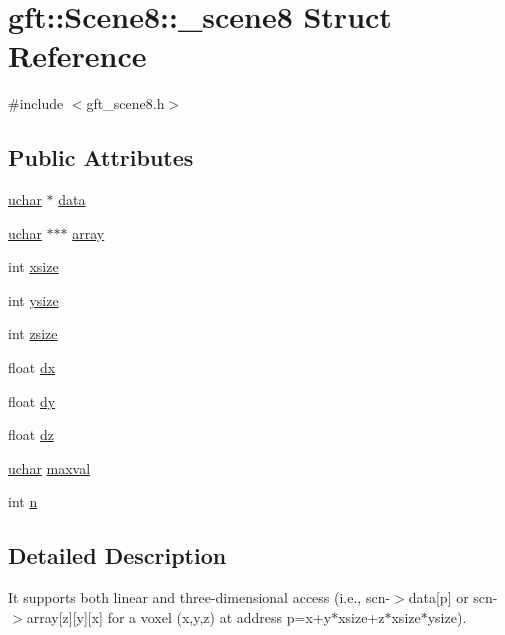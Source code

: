\hypertarget{structgft_1_1Scene8_1_1__scene8}{\section{gft\-:\-:Scene8\-:\-:\-\_\-scene8 Struct Reference}
\label{structgft_1_1Scene8_1_1__scene8}
}


{\ttfamily \#include $<$gft\-\_\-scene8.\-h$>$}

\subsection*{Public Attributes}
\begin{DoxyCompactItemize}
\item 
\hyperlink{namespacegft_a6411e297d5ac5aa9b91a37da00952197}{uchar} $\ast$ \hyperlink{structgft_1_1Scene8_1_1__scene8_aa5d6579e1b372370786e9fcac9aca62c}{data}
\item 
\hyperlink{namespacegft_a6411e297d5ac5aa9b91a37da00952197}{uchar} $\ast$$\ast$$\ast$ \hyperlink{structgft_1_1Scene8_1_1__scene8_abf9e43eda468d5bf3ab460f9d143a7e6}{array}
\item 
int \hyperlink{structgft_1_1Scene8_1_1__scene8_ac686ab156e37bf22332b69cd7cf099c4}{xsize}
\item 
int \hyperlink{structgft_1_1Scene8_1_1__scene8_ae19304fd5aa167a6142b0637312a6da9}{ysize}
\item 
int \hyperlink{structgft_1_1Scene8_1_1__scene8_a356d326df4b0c6d8e9695911f6459973}{zsize}
\item 
float \hyperlink{structgft_1_1Scene8_1_1__scene8_a71585f82d61052a311f77efd4590a5ce}{dx}
\item 
float \hyperlink{structgft_1_1Scene8_1_1__scene8_a964ee1caee6b4a9834323af941355295}{dy}
\item 
float \hyperlink{structgft_1_1Scene8_1_1__scene8_a4d77ad33b9afe9effd883f30e6dae0fb}{dz}
\item 
\hyperlink{namespacegft_a6411e297d5ac5aa9b91a37da00952197}{uchar} \hyperlink{structgft_1_1Scene8_1_1__scene8_a551af784995451a929073da897c4bb27}{maxval}
\item 
int \hyperlink{structgft_1_1Scene8_1_1__scene8_a4a7fd663bf97723061b167fbbcc24554}{n}
\end{DoxyCompactItemize}


\subsection{Detailed Description}
It supports both linear and three-\/dimensional access (i.\-e., scn-\/$>$data\mbox{[}p\mbox{]} or scn-\/$>$array\mbox{[}z\mbox{]}\mbox{[}y\mbox{]}\mbox{[}x\mbox{]} for a voxel (x,y,z) at address p=x+y$\ast$xsize+z$\ast$xsize$\ast$ysize). 

